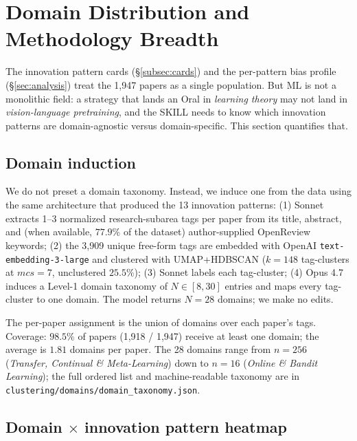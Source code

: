 \documentclass[10pt,a4paper]{article}
\begin{document}
\section{Domain Distribution and Methodology Breadth}
\label{sec:domains}

The innovation pattern cards (\S\ref{subsec:cards}) and the per-pattern bias profile (\S\ref{sec:analysis}) treat the 1{,}947 papers as a single population. But ML is not a monolithic field: a strategy that lands an Oral in \emph{learning theory} may not land in \emph{vision-language pretraining}, and the SKILL needs to know which innovation patterns are domain-agnostic versus domain-specific. This section quantifies that.

\subsection{Domain induction}
\label{subsec:domain-induction}

We do not preset a domain taxonomy. Instead, we induce one from the data using the same architecture that produced the 13 innovation patterns: (1) Sonnet extracts 1--3 normalized research-subarea tags per paper from its title, abstract, and (when available, $77.9\%$ of the dataset) author-supplied OpenReview keywords; (2) the 3{,}909 unique free-form tags are embedded with OpenAI \texttt{text-embedding-3-large} and clustered with UMAP+HDBSCAN ($k{=}148$ tag-clusters at $\textit{mcs}{=}7$, unclustered $25.5\%$); (3) Sonnet labels each tag-cluster; (4) Opus 4.7 induces a Level-1 domain taxonomy of $N \in [8, 30]$ entries and maps every tag-cluster to one domain. The model returns $N{=}28$ domains; we make no edits.

The per-paper assignment is the union of domains over each paper's tags. Coverage: $\mathbf{98.5\%}$ of papers (1{,}918 / 1{,}947) receive at least one domain; the average is $1.81$ domains per paper. The 28 domains range from $n{=}256$ (\textit{Transfer, Continual \& Meta-Learning}) down to $n{=}16$ (\textit{Online \& Bandit Learning}); the full ordered list and machine-readable taxonomy are in \texttt{clustering/domains/domain\_taxonomy.json}.

\subsection{Domain $\times$ innovation pattern heatmap}
\label{subsec:dm-heatmap}
\end{document}
